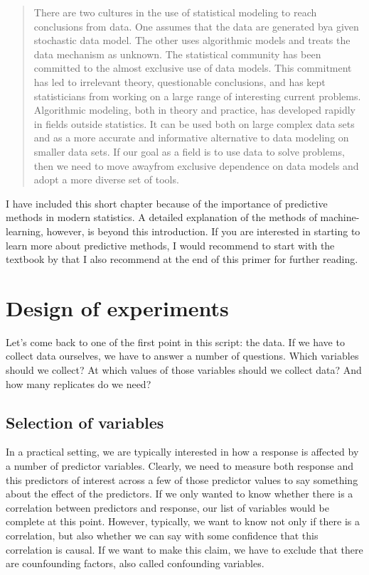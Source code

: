\documentclass[a4paper,twoside]{tufte-book}\usepackage[]{graphicx}\usepackage[]{color}
\begin{document}
\begin{quote}
There are two cultures in the use of statistical modeling to reach conclusions from data. One assumes that the data are generated bya given stochastic data model. The other uses algorithmic models and treats the data mechanism as unknown. The statistical community has been committed to the almost exclusive use of data models. This commitment has led to irrelevant theory, questionable conclusions, and has kept statisticians from working on a large range of interesting current problems. Algorithmic modeling, both in theory and practice, has developed rapidly in fields outside statistics. It can be used both on large complex data sets and as a more accurate and informative alternative to data modeling on smaller data sets. If our goal as a field is to use data to solve problems, then we need to move awayfrom exclusive dependence on data models and adopt a more diverse set of tools.
\end{quote}


I have included this short chapter because of the importance of predictive methods in modern statistics. A detailed explanation of the methods of machine-learning, however, is beyond this introduction. If you are interested in starting to learn more about predictive methods, I would recommend to start with the textbook by  \citet{James-IntroductiontoStatistical-2013} that I also recommend at the end of this primer for further reading. 

\chapter{Design of experiments}\label{cha: design of experiments}

Let's come back to one of the first point in this script: the data. If we have to collect data ourselves, we have to answer a number of questions. Which variables should we collect? At which values of those variables should we collect data? And how many replicates do we need?


\section{Selection of variables}

In a practical setting, we are typically interested in how a response is affected by a number of predictor variables. Clearly, we need to measure both response and this predictors of interest across a few of those predictor values to say something about the effect of the predictors.  If we only wanted to know whether there is a correlation between predictors and response, our list of variables would be complete at this point. However, typically, we want to know not only if there is a correlation, but also whether we can say with some confidence that this correlation is causal. If we want to make this claim, we have to exclude that there are counfounding factors, also called confounding variables. 
\end{document}
